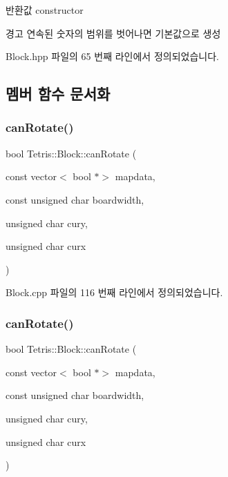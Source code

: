 \begin{DoxyReturn}{반환값}
constructor 
\end{DoxyReturn}
\begin{DoxyWarning}{경고}
연속된 숫자의 범위를 벗어나면 기본값으로 생성 
\end{DoxyWarning}


Block.\+hpp 파일의 65 번째 라인에서 정의되었습니다.



\subsection{멤버 함수 문서화}
\mbox{\label{class_tetris_1_1_block_a56d194d0a5d56d2d1220ec32774cea38}} 
\subsubsection{\texorpdfstring{can\+Rotate()}{canRotate()}\hspace{0.1cm}{\footnotesize\ttfamily [1/2]}}
{\footnotesize\ttfamily bool Tetris\+::\+Block\+::can\+Rotate (\begin{DoxyParamCaption}\item[{const vector$<$ bool $\ast$$>$}]{mapdata,  }\item[{const unsigned char}]{boardwidth,  }\item[{unsigned char}]{cury,  }\item[{unsigned char}]{curx }\end{DoxyParamCaption})}



Block.\+cpp 파일의 116 번째 라인에서 정의되었습니다.

\mbox{\label{class_tetris_1_1_block_a56d194d0a5d56d2d1220ec32774cea38}} 
\subsubsection{\texorpdfstring{can\+Rotate()}{canRotate()}\hspace{0.1cm}{\footnotesize\ttfamily [2/2]}}
{\footnotesize\ttfamily bool Tetris\+::\+Block\+::can\+Rotate (\begin{DoxyParamCaption}\item[{const vector$<$ bool $\ast$$>$}]{mapdata,  }\item[{const unsigned char}]{boardwidth,  }\item[{unsigned char}]{cury,  }\item[{unsigned char}]{curx }\end{DoxyParamCaption})\hspace{0.3cm}{\ttfamily [inline]}}

